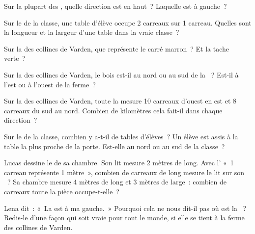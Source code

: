 \begin{exercise}[$\star$]\label{exo:g2:drawing-to-map:4}
Sur la plupart des , quelle direction est en haut~? Laquelle est à gauche~?
\end{exercise}

\begin{exercise}[$\star$]\label{exo:g2:drawing-to-map:5}
Sur le  de la classe, une table d'élève occupe 2 carreaux sur
1 carreau. Quelles sont la longueur et la largeur d'une table dans la vraie
classe~?
\end{exercise}

\begin{exercise}[$\star$]\label{exo:g2:drawing-to-map:6}
Sur la  des collines de Varden, que représente le carré marron~? Et
la tache verte~?
\end{exercise}

\begin{exercise}[$\star\star$]\label{exo:g2:drawing-to-map:7}
Sur la  des collines de Varden, le bois est-il au nord ou au sud de la
~? Est-il à l'est ou à l'ouest de la ferme~?
\end{exercise}

\begin{exercise}[$\star\star$]\label{exo:g2:drawing-to-map:8}
Sur la  des collines de Varden, toute la  mesure 10 carreaux
d'ouest en est et 8 carreaux du sud au nord. Combien de kilomètres cela
fait-il dans chaque direction~?
\end{exercise}

\begin{exercise}[$\star\star$]\label{exo:g2:drawing-to-map:9}
Sur le  de la classe, combien y a-t-il de tables d'élèves~? Un élève
est assis à la table la plus proche de la porte. Est-elle au nord ou au sud
de la classe~?
\end{exercise}

\begin{exercise}[$\star\star$]\label{exo:g2:drawing-to-map:10}
Lucas dessine le  de sa chambre. Son lit mesure 2 mètres de long. Avec
l' «~1 carreau représente 1 mètre~», combien de carreaux de long
mesure le lit sur son ~? Sa chambre mesure 4 mètres de long et
3 mètres de large~: combien de carreaux toute la pièce occupe-t-elle~?
\end{exercise}

\begin{exercise}[$\star\star$]\label{exo:g2:drawing-to-map:11}
Lena dit~: «~La  est à ma gauche.~» Pourquoi cela ne nous dit-il pas
où est la ~? Redis-le d'une façon qui soit vraie pour tout le monde,
si elle se tient à la ferme des collines de Varden.
\end{exercise}

